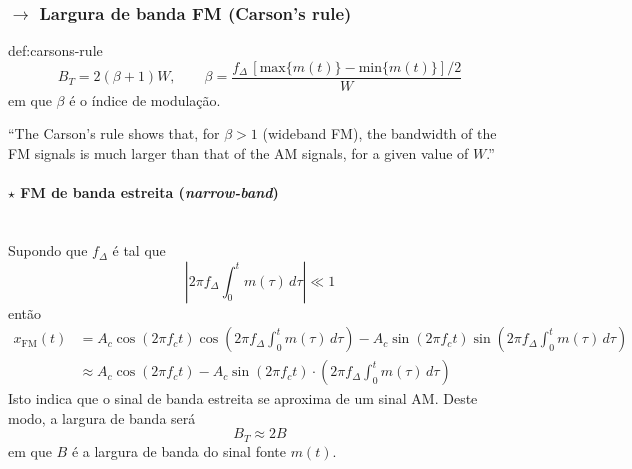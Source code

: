 \subsubsection[2.2.2 Largura de banda FM (Carson's rule)]{$\rightarrow$ Largura de banda FM (Carson's rule)}
\label{subsubsec:FM}

\begin{theo}{def:carsons-rule}\label{def:carsons-rule}
$$
    B_T = 2(\beta + 1)W,\qquad \beta = \frac{f_\Delta\, \left[\text{max}\{m(t)\} - \text{min}\{m(t)\}\right]/2}{W}
$$
em que $\beta$ é o índice de modulação.
\end{theo}

\noindent ``The Carson’s rule shows that, for $\beta > 1$ (wideband FM), the bandwidth of the FM signals is much larger than that of the AM signals, for a given value of $W$.''\cite{Nunes2015}

\newpage

\paragraph[2.2.2.1 FM de banda estreita]{$\pmb{\star}$ FM de banda estreita (\textit{narrow-band})}\mbox{}\\
\noindent Supondo que $f_\Delta$ é tal que  
$$
    \left| 2\pi f_\Delta \int_{0}^{t} m(\tau)\, d\tau \right| \ll 1
$$
então
\begin{align*}
    x_{\text{FM}}(t) &= A_c \cos(2\pi f_c t) \cos( 2\pi f_\Delta \int_{0}^{t} m(\tau)\, d\tau ) - A_c \sin(2\pi f_c t) \sin( 2\pi f_\Delta \int_{0}^{t} m(\tau)\, d\tau ) \\
                     &\approx A_c \cos(2\pi f_c t) - A_c \sin(2\pi f_c t) \cdot \left( 2\pi f_\Delta \int_{0}^{t} m(\tau)\, d\tau \right)
\end{align*}
Isto indica que o sinal de banda estreita se aproxima de um sinal AM. Deste modo, a largura de banda será
$$
    B_T \approx 2B
$$
em que $B$ é a largura de banda do sinal fonte $m(t)$.

